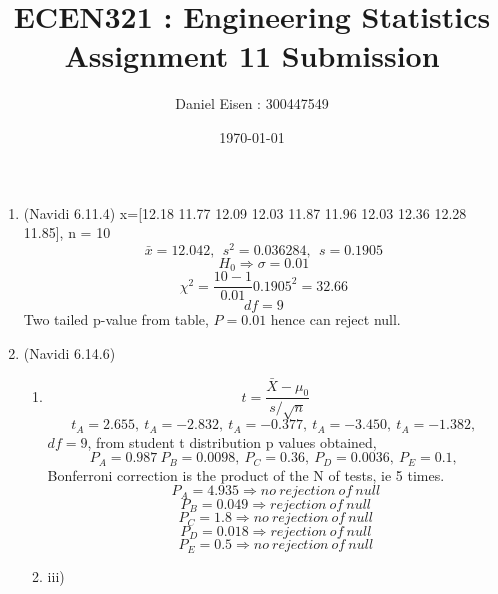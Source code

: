 \documentclass[11pt]{article}
\title{ECEN321 : Engineering Statistics \\ Assignment 11 Submission}
\author{Daniel Eisen : 300447549}
\date{\today}
\begin{document}
\begin{preview}
\maketitle
\begin{enumerate}
\section*{Hypothesis Tests}
\item (Navidi 6.11.4) x=[12.18 11.77 12.09 12.03 11.87 11.96 12.03 12.36 12.28 11.85], n = 10
$$\bar{x} = 12.042, \:\: s^2=0.036284, \:\: s=0.1905$$
$$H_0 \Rightarrow \sigma=0.01$$
$$\chi^2 = \frac{10-1}{0.01}0.1905^2 = 32.66$$
$$df = 9$$
Two tailed p-value from table, $P=0.01$ hence can reject null.

\item (Navidi 6.14.6) 
\begin{enumerate}
        \item $$t = \frac{\bar{X} - \mu_0}{s/\sqrt{n}}$$
        $$t_A = 2.655,\:t_A = -2.832,\:t_A = -0.377,\:t_A = -3.450,\:t_A = -1.382,\:$$
        $df = 9$, from student t distribution p values obtained, $$P_A = 0.987\:P_B = 0.0098,\:P_C = 0.36,\:P_D = 0.0036,\:P_E = 0.1,\:$$
        Bonferroni correction is the product of the N of tests, ie 5 times.
        $$P_A = 4.935 \Rightarrow no\:rejection\:of\:null$$
        $$P_B = 0.049 \Rightarrow rejection\:of\:null$$
        $$P_C = 1.8 \Rightarrow no\:rejection\:of\:null$$
        $$P_D = 0.018 \Rightarrow rejection\:of\:null$$
        $$P_E = 0.5 \Rightarrow no\:rejection\:of\:null$$
        \item iii)
\end{enumerate}

\end{enumerate}
\end{preview}
\end{document}
